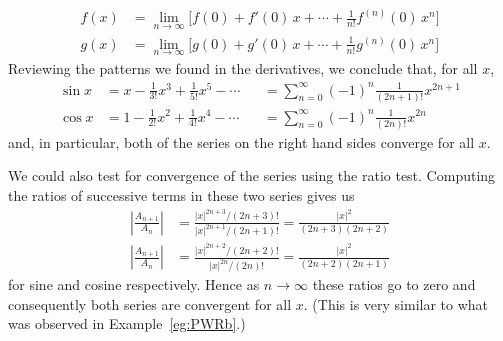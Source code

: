 \begin{eg}
\begin{align*}
f(x)&=\lim_{n\rightarrow\infty}\Big[f(0)+f'(0)\,x+\cdots
                +\tfrac{1}{n!}f^{(n)}(0)\, x^n\Big] \\
g(x)&=\lim_{n\rightarrow\infty}\Big[g(0)+g'(0)\,x+\cdots
                +\tfrac{1}{n!}g^{(n)}(0)\, x^n\Big]
\end{align*}
Reviewing the patterns we found in the derivatives, we conclude that,
for all $x$,
\begin{equation*}%
\begin{alignedat}{2}
\sin x &= x-\tfrac{1}{3!}x^3+\tfrac{1}{5!}x^5-\cdots&
       &=\sum_{n=0}^\infty(-1)^n\tfrac{1}{(2n+1)!}x^{2n+1}\\
\cos x &= 1-\tfrac{1}{2!}x^2+\tfrac{1}{4!}x^4-\cdots&
       &=\sum_{n=0}^\infty(-1)^n\tfrac{1}{(2n)!}x^{2n}
\end{alignedat}
\end{equation*}
and, in particular, both of the series on the right hand sides converge
for all $x$.

We could also test for convergence of the series using
the ratio test. Computing the ratios of successive terms in these
two series gives us
\begin{align*}
  \left| \frac{A_{n+1}}{A_n} \right|
        &= \frac{|x|^{2n+3}/(2n+3)!}{|x|^{2n+1}/(2n+1)!}
         = \frac{|x|^2}{(2n+3)(2n+2)} \\
  \left| \frac{A_{n+1}}{A_n} \right|
        &= \frac{|x|^{2n+2}/(2n+2)!}{|x|^{2n}/(2n)!}
         = \frac{|x|^2}{(2n+2)(2n+1)}
\end{align*}
for sine and cosine respectively. Hence as $n \to \infty$ these ratios go to zero and consequently both series are
convergent for all $x$. (This is very similar to what was observed in Example~\ref{eg:PWRb}.)
\end{eg}


